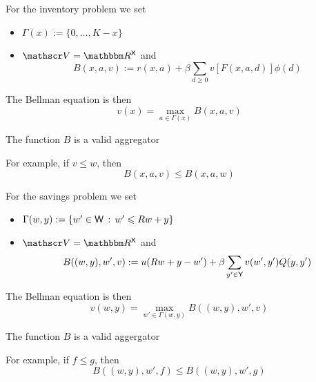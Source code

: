 \begin{frame}
    

    \Eg For the inventory problem we set 
    \begin{itemize}
        \item $\Gamma(x) := \{0, \ldots, K - x\}$
        \vspace{0.3em}
        \item $\vV = \RR^\Xsf$ and
        \begin{equation*}
            B(x, a, v) :=
                r(x, a)
                + \beta
                \sum_{d \geq 0} v[F(x,a,d)] \phi(d)
        \end{equation*}
    \end{itemize}

    The Bellman equation is then 
    $$v(x) = \max_{a \in \Gamma(x)} B(x, a, v)$$

    The function $B$ is a valid aggregator

        \vspace{0.3em}
    For example, if $v \leq w$, then
    \begin{equation*}
        B(x, a, v) \leq B(x, a, w)
    \end{equation*}

\end{frame}


\begin{frame}
    

    \Eg For the savings problem we set 
    \begin{itemize}
        \item $\Gamma(w, y) := \{w' \in \mathsf W \,:\, w' \leqslant Rw + y\}$
        \vspace{0.3em}
        \item $\vV = \RR^\Xsf$ and
        \begin{equation*}
            B((w,y), w', v) :=
            u(R w + y - w')
            + \beta \sum_{y' \in \mathsf Y} v(w', y') Q(y, y')
        \end{equation*}
    \end{itemize}

    The Bellman equation is then 
    $$v(w, y) = \max_{w' \in \Gamma(w, y)} B((w, y), w', v)$$

    The function $B$ is a valid aggergator

        \vspace{0.3em}
    For example, if $f \leq g$, then
    \begin{equation*}
        B((w,y), w', f) \leq B((w,y), w', g)
    \end{equation*}

\end{frame}



